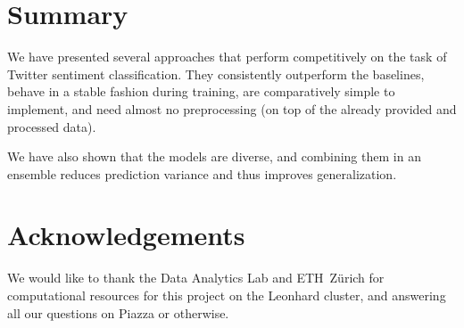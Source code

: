 \documentclass[10pt,conference,compsocconf]{IEEEtran}
\begin{document}
\section{Summary}
We have presented several approaches that perform competitively on the task of Twitter sentiment classification.
They consistently outperform the baselines, behave in a stable fashion during training, are comparatively simple to implement, and need almost no preprocessing (on top of the already provided and processed data).

We have also shown that the models are diverse, and combining them in an ensemble reduces prediction variance and thus improves generalization.

\section*{Acknowledgements}

We would like to thank the Data Analytics Lab and ETH~Z\"{u}rich for computational resources for this project on the Leonhard cluster, and answering all our questions on Piazza or otherwise.

\newpage





\end{document}
